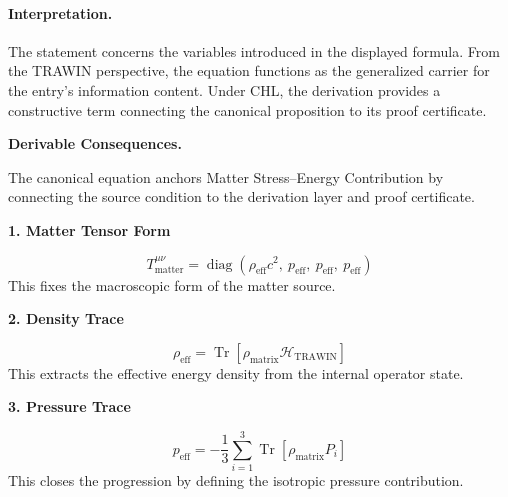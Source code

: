 \paragraph{Interpretation.}
The statement concerns the variables introduced in the displayed formula. From the TRAWIN perspective, the equation functions as the generalized carrier for the entry’s information content. Under CHL, the derivation provides a constructive term connecting the canonical proposition to its proof certificate.

\par\vspace{0.35em}
\noindent\textbf{Derivable Consequences.}\quad
\begingroup
\footnotesize
\raggedright
The canonical equation anchors Matter Stress--Energy Contribution by connecting the source condition to the derivation layer and proof certificate.
\par\endgroup

\noindent\textbf{1. Matter Tensor Form}\par
\[
T_{\mathrm{matter}}^{\mu\nu}
=
\operatorname{diag}\!\left(
\rho_{\mathrm{eff}}c^2,\ p_{\mathrm{eff}},\ p_{\mathrm{eff}},\ p_{\mathrm{eff}}
\right)
\]
\noindent This fixes the macroscopic form of the matter source.\par
\noindent\textbf{2. Density Trace}\par
\[
\rho_{\mathrm{eff}}
=
\operatorname{Tr}\!\left[\rho_{\mathrm{matrix}}\mathcal{H}_{\mathrm{TRAWIN}}\right]
\]
\noindent This extracts the effective energy density from the internal operator state.\par
\noindent\textbf{3. Pressure Trace}\par
\[
p_{\mathrm{eff}}
=
-\frac{1}{3}\sum_{i=1}^{3}\operatorname{Tr}\!\left[\rho_{\mathrm{matrix}}P_i\right]
\]
\noindent This closes the progression by defining the isotropic pressure contribution.\par

